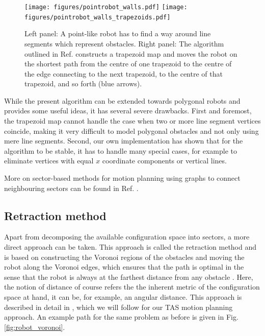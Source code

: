 \begin{figure}[htb]
	\centering
	\texttt{[image: figures/pointrobot\_walls.pdf]}
	\hspace{1 cm}
	\texttt{[image: figures/pointrobot\_walls\_trapezoids.pdf]}
	\caption[Pathfinding using trapezoid maps.]{
		Left panel: A point-like robot has to find a way around line segments 
		which represent obstacles. 
		Right panel: The algorithm outlined in Ref. \cite[p. 289]{Berg2008} 
		constructs a trapezoid map and moves the robot on the shortest path from 
		the centre of one trapezoid to the centre of the edge connecting to the 
		next trapezoid, to the centre of that trapezoid, and so forth (blue arrows).}
	\label{fig:robot_trapezoids}
\end{figure}

While the present algorithm can be extended towards polygonal robots \cite[Ch. 13.3, pp. 290-297]{Berg2008} 
and provides some useful ideas, it has several severe drawbacks. First and 
foremost, the trapezoid map cannot handle the case when two or more line segment 
vertices coincide, making it very difficult to model polygonal obstacles and not 
only using mere line segments. Second, our own implementation has shown that for 
the algorithm to be stable, it has to handle many special cases, for example to 
eliminate vertices with equal $x$ coordinate components or vertical lines.

More on sector-based methods for motion planning using graphs to connect neighbouring
sectors can be found in Ref. \cite{Choset2010_ch6}.

\vspace{0.5cm}

\subsection{Retraction method}
Apart from decomposing the available configuration space into sectors, a more 
direct approach can be taken. 
This approach is called the retraction method and is based on constructing the 
Voronoi regions of the obstacles and moving the robot along the Voronoi edges, 
which ensures that the path is optimal in the sense that the robot is always at 
the farthest distance from any obstacle \cite[pp. 163 and 304]{Berg2008}.
Here, the notion of distance of course refers the the inherent metric of the configuration space
at hand, it can be, for example, an angular distance.
This approach is described in detail in \cite[Ch. 5.4.3, pp. 247-251]{FUH_geo2020}, which
we will follow for our TAS motion planning approach.
An example path for the same problem as before is given in Fig. \ref{fig:robot_voronoi}.


